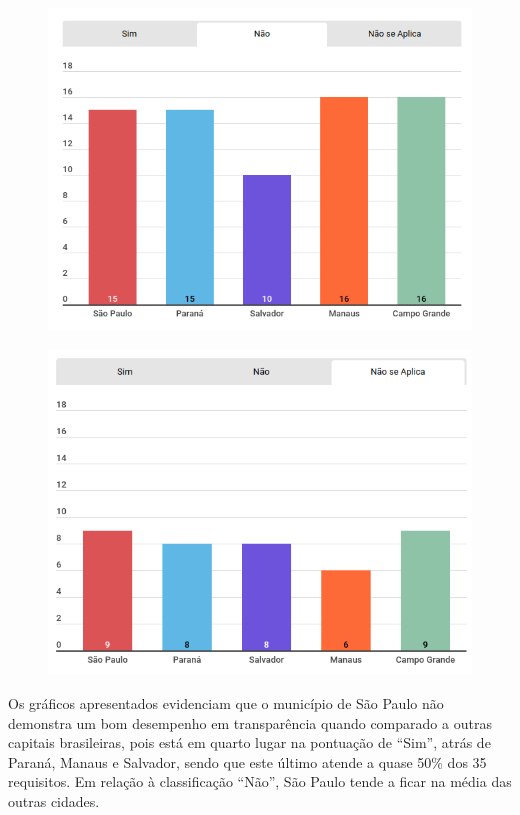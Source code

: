 \begin{figure}[H]
    \centering
    \includegraphics[scale=0.5]{images/grafico3.png}
    \label{fig:4}
\end{figure}

\begin{figure}[H]
    \centering
    \includegraphics[scale=0.5]{images/grafico4.png}
    \label{fig:5}
\end{figure}

Os gráficos apresentados evidenciam que o município de São Paulo não demonstra um bom desempenho em transparência quando comparado a outras capitais brasileiras, pois está em quarto lugar na pontuação de ``Sim'', atrás de Paraná, Manaus e Salvador, sendo que este último atende a quase 50\% dos 35 requisitos. Em relação à classificação ``Não'', São Paulo tende a ficar na média das outras cidades.

